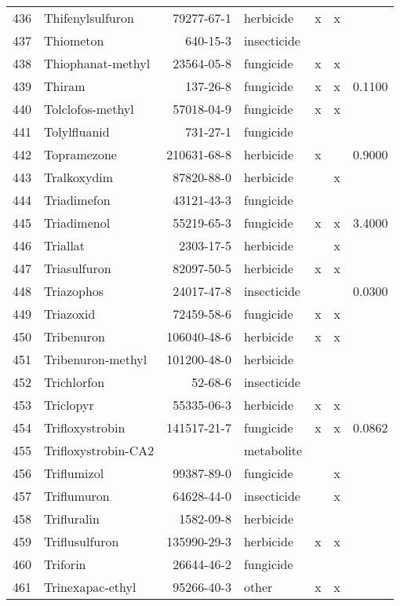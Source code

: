 \begin{longtable}{lp{4cm}rlp{1.3cm}p{1.3cm}p{1.5cm}}
  436 & Thifenylsulfuron & 79277-67-1 & herbicide & x & x &  \\ 
  437 & Thiometon & 640-15-3 & insecticide &  &  &  \\ 
  438 & Thiophanat-methyl & 23564-05-8 & fungicide & x & x &  \\ 
  439 & Thiram & 137-26-8 & fungicide & x & x & 0.1100 \\ 
  440 & Tolclofos-methyl & 57018-04-9 & fungicide & x & x &  \\ 
  441 & Tolylfluanid & 731-27-1 & fungicide &  &  &  \\ 
  442 & Topramezone & 210631-68-8 & herbicide & x &  & 0.9000 \\ 
  443 & Tralkoxydim & 87820-88-0 & herbicide &  & x &  \\ 
  444 & Triadimefon & 43121-43-3 & fungicide &  &  &  \\ 
  445 & Triadimenol & 55219-65-3 & fungicide & x & x & 3.4000 \\ 
  446 & Triallat & 2303-17-5 & herbicide &  & x &  \\ 
  447 & Triasulfuron & 82097-50-5 & herbicide & x & x &  \\ 
  448 & Triazophos & 24017-47-8 & insecticide &  &  & 0.0300 \\ 
  449 & Triazoxid & 72459-58-6 & fungicide & x & x &  \\ 
  450 & Tribenuron & 106040-48-6 & herbicide & x & x &  \\ 
  451 & Tribenuron-methyl & 101200-48-0 & herbicide &  &  &  \\ 
  452 & Trichlorfon & 52-68-6 & insecticide &  &  &  \\ 
  453 & Triclopyr & 55335-06-3 & herbicide & x & x &  \\ 
  454 & Trifloxystrobin & 141517-21-7 & fungicide & x & x & 0.0862 \\ 
  455 & Trifloxystrobin-CA2 &  & metabolite &  &  &  \\ 
  456 & Triflumizol & 99387-89-0 & fungicide &  & x &  \\ 
  457 & Triflumuron & 64628-44-0 & insecticide &  & x &  \\ 
  458 & Trifluralin & 1582-09-8 & herbicide &  &  &  \\ 
  459 & Triflusulfuron & 135990-29-3 & herbicide & x & x &  \\ 
  460 & Triforin & 26644-46-2 & fungicide &  &  &  \\ 
  461 & Trinexapac-ethyl & 95266-40-3 & other & x & x &  \\ 

\end{longtable}
